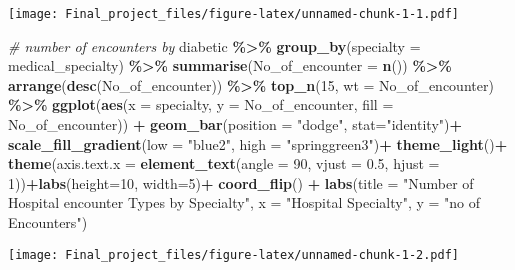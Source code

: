 \documentclass[
]{article}
\newenvironment{Shaded}{\begin{snugshade}}{\end{snugshade}}
\newcommand{\AttributeTok}[1]{\textcolor[rgb]{0.13,0.29,0.53}{#1}}
\newcommand{\CommentTok}[1]{\textcolor[rgb]{0.56,0.35,0.01}{\textit{#1}}}
\newcommand{\DecValTok}[1]{\textcolor[rgb]{0.00,0.00,0.81}{#1}}
\newcommand{\FloatTok}[1]{\textcolor[rgb]{0.00,0.00,0.81}{#1}}
\newcommand{\FunctionTok}[1]{\textcolor[rgb]{0.13,0.29,0.53}{\textbf{#1}}}
\newcommand{\NormalTok}[1]{#1}
\newcommand{\SpecialCharTok}[1]{\textcolor[rgb]{0.81,0.36,0.00}{\textbf{#1}}}
\newcommand{\StringTok}[1]{\textcolor[rgb]{0.31,0.60,0.02}{#1}}
\begin{document}
\texttt{[image: Final\_project\_files/figure-latex/unnamed-chunk-1-1.pdf]}

\begin{Shaded}
\begin{Highlighting}[]
\CommentTok{\# number of encounters by }
\NormalTok{diabetic  }\SpecialCharTok{\%\textgreater{}\%} \FunctionTok{group\_by}\NormalTok{(}\AttributeTok{specialty =}\NormalTok{ medical\_specialty) }\SpecialCharTok{\%\textgreater{}\%}
  \FunctionTok{summarise}\NormalTok{(}\AttributeTok{No\_of\_encounter =} \FunctionTok{n}\NormalTok{()) }\SpecialCharTok{\%\textgreater{}\%}
  \FunctionTok{arrange}\NormalTok{(}\FunctionTok{desc}\NormalTok{(No\_of\_encounter)) }\SpecialCharTok{\%\textgreater{}\%}
  \FunctionTok{top\_n}\NormalTok{(}\DecValTok{15}\NormalTok{, }\AttributeTok{wt =}\NormalTok{ No\_of\_encounter) }\SpecialCharTok{\%\textgreater{}\%} 
  \FunctionTok{ggplot}\NormalTok{(}\FunctionTok{aes}\NormalTok{(}\AttributeTok{x =}\NormalTok{ specialty, }\AttributeTok{y =}\NormalTok{ No\_of\_encounter, }\AttributeTok{fill =}\NormalTok{ No\_of\_encounter)) }\SpecialCharTok{+}
  \FunctionTok{geom\_bar}\NormalTok{(}\AttributeTok{position =} \StringTok{"dodge"}\NormalTok{, }\AttributeTok{stat=}\StringTok{"identity"}\NormalTok{)}\SpecialCharTok{+}
  \FunctionTok{scale\_fill\_gradient}\NormalTok{(}\AttributeTok{low =} \StringTok{"blue2"}\NormalTok{, }\AttributeTok{high =} \StringTok{"springgreen3"}\NormalTok{)}\SpecialCharTok{+}
  \FunctionTok{theme\_light}\NormalTok{()}\SpecialCharTok{+}
  \FunctionTok{theme}\NormalTok{(}\AttributeTok{axis.text.x =} \FunctionTok{element\_text}\NormalTok{(}\AttributeTok{angle =} \DecValTok{90}\NormalTok{, }\AttributeTok{vjust =} \FloatTok{0.5}\NormalTok{, }\AttributeTok{hjust =} \DecValTok{1}\NormalTok{))}\SpecialCharTok{+}\FunctionTok{labs}\NormalTok{(}\AttributeTok{height=}\DecValTok{10}\NormalTok{, }\AttributeTok{width=}\DecValTok{5}\NormalTok{)}\SpecialCharTok{+}
  \FunctionTok{coord\_flip}\NormalTok{() }\SpecialCharTok{+} \FunctionTok{labs}\NormalTok{(}\AttributeTok{title =} \StringTok{"Number of Hospital encounter Types by Specialty"}\NormalTok{, }\AttributeTok{x =} \StringTok{"Hospital Specialty"}\NormalTok{, }\AttributeTok{y =} \StringTok{"no of Encounters"}\NormalTok{)}
\end{Highlighting}
\end{Shaded}

\texttt{[image: Final\_project\_files/figure-latex/unnamed-chunk-1-2.pdf]}
\end{document}
